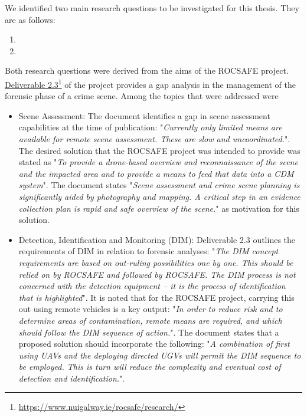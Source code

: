 We identified two main research questions to be investigated for this thesis. They are as follows:
\begin{enumerate}

    \item  
    
    \item 
    
\end{enumerate}

Both research questions were derived from the aims of the ROCSAFE project. \href{https://www.nuigalway.ie/rocsafe/research/}{Deliverable 2.3}\footnote{\href {https://www.nuigalway.ie/rocsafe/research/}{https://www.nuigalway.ie/rocsafe/research/}} of the project provides a gap analysis in the management of the forensic phase of a crime scene. 
Among the topics that were addressed were
\begin{itemize}
    \item Scene Assessment: The document identifies a gap in scene assessment capabilities at the time of publication: 
"\textit{Currently only limited means are available for remote scene assessment. These are slow and uncoordinated.}". The desired solution that the ROCSAFE project was intended to provide was stated as "\textit{To provide a drone-based overview and reconnaissance of the scene and the impacted area and to provide a means to feed that data into a CDM system}". The document states "\textit{Scene assessment and crime scene planning is significantly aided by photography and mapping.  A critical step in an evidence collection plan is rapid and safe overview of the scene.}" as motivation for this solution.

    \item Detection, Identification and Monitoring (DIM): Deliverable 2.3 outlines the requirements of DIM in relation to forensic analyses:
    "\textit{The DIM concept requirements are based on out-ruling possibilities one by one. This should be relied on by ROCSAFE and followed by ROCSAFE. The DIM process is not concerned with the detection equipment – it is the process of identification that is highlighted}". It is noted that for the ROCSAFE project, carrying this out using remote vehicles is a key output: "\textit{In order to reduce risk and to determine areas of contamination, remote means are required, and which should follow the DIM sequence of action.}". The document states that a proposed solution should incorporate the following: "\textit{A combination of first using UAVs and the deploying directed UGVs will permit the DIM sequence to be employed. This is turn will reduce the complexity and eventual cost of detection and identification.}".
\end{itemize}

